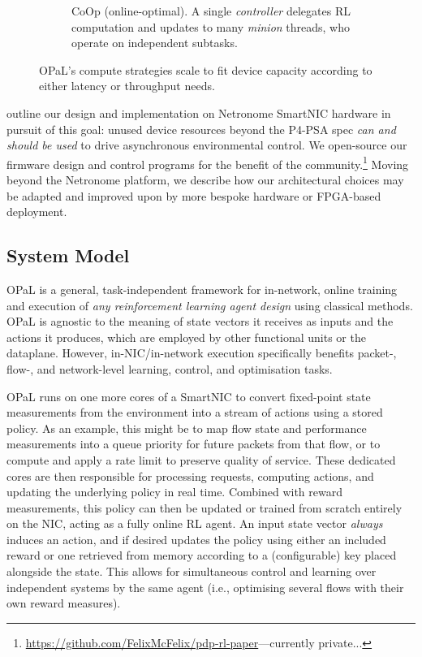 \documentclass[sigconf,natbib=false]{acmart}
\newcommand{\approachshort}{OPaL}
\newcommand{\Coopfw}{CoOp}
\begin{document}
\begin{figure}
\begin{subfigure}{0.45\linewidth}
		\caption{\Coopfw{} (online-optimal). A single \emph{controller} delegates RL computation and updates to many \emph{minion} threads, who operate on independent subtasks.\label{fig:single-and-parallel:parallel}}
	\end{subfigure}
	\caption{\approachshort{}'s compute strategies scale to fit device capacity according to either latency or throughput needs.\label{fig:single-and-parallel}}
\end{figure}

 outline our design and implementation on Netronome SmartNIC hardware in pursuit of this goal: unused device resources beyond the P4-PSA spec \emph{can and should be used} to drive asynchronous environmental control.
We open-source our firmware design and control programs for the benefit of the community.\footnote{\url{https://github.com/FelixMcFelix/pdp-rl-paper}---currently private...}
Moving beyond the Netronome platform, we describe how our architectural choices may be adapted and improved upon by more bespoke hardware or FPGA-based deployment.

\subsection{System Model}
\approachshort{} is a general, task-independent framework for in-network, online training and execution of \emph{any reinforcement learning agent design} using classical methods.
\approachshort{} is agnostic to the meaning of state vectors it receives as inputs and the actions it produces, which are employed by other functional units or the dataplane.
However, in-NIC/in-network execution specifically benefits packet-, flow-, and network-level learning, control, and optimisation tasks.

\approachshort{} runs on one more cores of a SmartNIC to convert fixed-point state measurements from the environment into a stream of actions using a stored policy.
As an example, this might be to map flow state and performance measurements into a queue priority for future packets from that flow, or to compute and apply a rate limit to preserve quality of service.
These dedicated cores are then responsible for processing requests, computing actions, and updating the underlying policy in real time.
Combined with reward measurements, this policy can then be updated or trained from scratch entirely on the NIC, acting as a fully online RL agent.
An input state vector \emph{always} induces an action, and if desired updates the policy using either an included reward or one retrieved from memory according to a (configurable) key placed alongside the state.
This allows for simultaneous control and learning over independent systems by the same agent (i.e., optimising several flows with their own reward measures).
\end{document}
